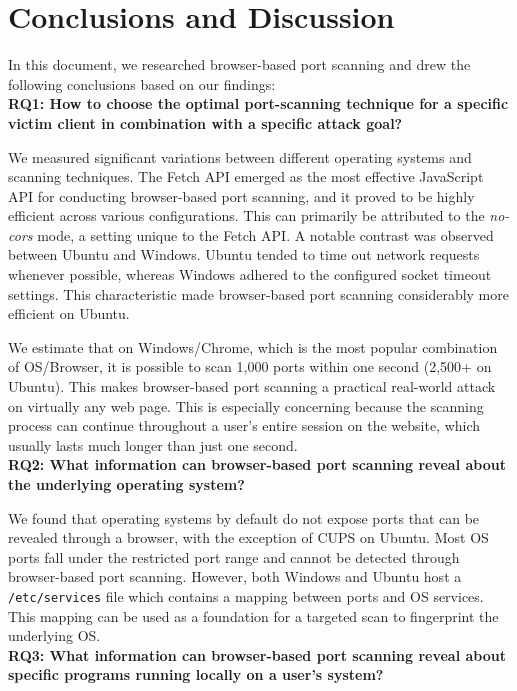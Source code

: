 \chapter{Conclusions and Discussion}

In this document, we researched browser-based port scanning and drew the following conclusions based on our findings: 
\\

\textbf{RQ1: How to choose the optimal port-scanning technique for a specific victim client in combination with a specific attack goal?}

We measured significant variations between different operating systems and scanning techniques. The Fetch API emerged as the most effective JavaScript API for conducting browser-based port scanning, and it proved to be highly efficient across various configurations. This can primarily be attributed to the \emph{no-cors} mode, a setting unique to the Fetch API.
A notable contrast was observed between Ubuntu and Windows. Ubuntu tended to time out network requests whenever possible, whereas Windows adhered to the configured socket timeout settings. This characteristic made browser-based port scanning considerably more efficient on Ubuntu.

We estimate that on Windows/Chrome, which is the most popular combination of OS/Browser, it is possible to scan 1,000 ports within one second (2,500+ on Ubuntu). This makes browser-based port scanning a practical real-world attack on virtually any web page. This is especially concerning because the scanning process can continue throughout a user's entire session on the website, which usually lasts much longer than just one second. 
\\

\textbf{RQ2: What information can browser-based port scanning reveal about the underlying operating system?}

We found that operating systems by default do not expose ports that can be revealed through a browser, with the exception of CUPS on Ubuntu. Most OS ports fall under the restricted port range and cannot be detected through browser-based port scanning. However, both Windows and Ubuntu host a \texttt{/etc/services} file which contains a mapping between ports and OS services. This mapping can be used as a foundation for a targeted scan to fingerprint the underlying OS.
\\

\textbf{RQ3: What information can browser-based port scanning reveal about specific programs
running locally on a user’s system?}


